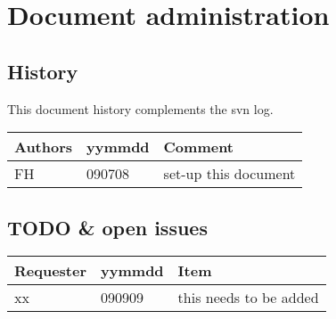 \section{Document administration}

\subsection{History} 
This document history complements the svn log.

\begin{tabular*}{\textwidth}{lll}
\hline
Authors & yymmdd & Comment \\
\hline
FH & 090708 & set-up this document \\
\hline
\end{tabular*}

\subsection{TODO \& open issues} 
\begin{tabular*}{\textwidth}{lll}
\hline
Requester & yymmdd & Item \\
\hline
xx & 090909 & this needs to be added \\
\hline
\end{tabular*}





%
%
%
%

